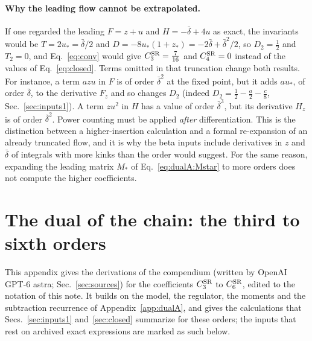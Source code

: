 \documentclass[11pt,a4paper]{article}
\numberwithin{equation}{section}
\newcommand{\CSR}{C^{\rm SR}}
\newcommand{\db}{\bar\delta}
\begin{document}
\paragraph{Why the leading flow cannot be extrapolated.} If one regarded the leading $F=z+u$ and $H=-\db+4u$ as
exact, the invariants would be $T=2u_*=\db/2$ and $D=-8u_*(1+z_*)=-2\db+\db^2/2$, so $D_2=\frac12$ and $T_2=0$, and
Eq.~\eqref{eq:conv} would give $\CSR_3=\frac7{16}$ and $\CSR_4=0$ instead of the values of Eq.~\eqref{eq:closed}.
Terms omitted in that truncation change both results. For instance, a term $azu$ in $F$ is of order $\db^2$ at the
fixed point, but it adds $au_*$, of order $\db$, to the derivative $F_z$ and so changes $D_2$ (indeed
$D_2=\frac12-\frac a2-\frac c8$, Sec.~\ref{sec:inputs1}). A term $zu^2$ in $H$ has a value of order $\db^3$, but its
derivative $H_z$ is of order $\db^2$. Power counting must be applied \emph{after} differentiation. This is the
distinction between a higher-insertion calculation and a formal re-expansion of an already truncated flow, and it is
why the beta inputs include derivatives in $z$ and $\db$ of integrals with more kinks than the order would suggest.
For the same reason, expanding the leading matrix $M_*$ of Eq.~\eqref{eq:dualA:Mstar} to more orders does not compute
the higher coefficients.

\section{The dual of the chain: the third to sixth orders}\label{app:dualB}
This appendix gives the derivations of the compendium (written by OpenAI GPT-6 astra; Sec.~\ref{sec:sources}) for
the coefficients $\CSR_3$ to $\CSR_6$, edited to the notation of this note. It builds on the model, the regulator,
the moments and the subtraction recurrence of Appendix~\ref{app:dualA}, and gives the calculations that
Secs.~\ref{sec:inputs1} and~\ref{sec:closed} summarize for these orders; the inputs that rest on archived exact
expressions are marked as such below.
\end{document}
